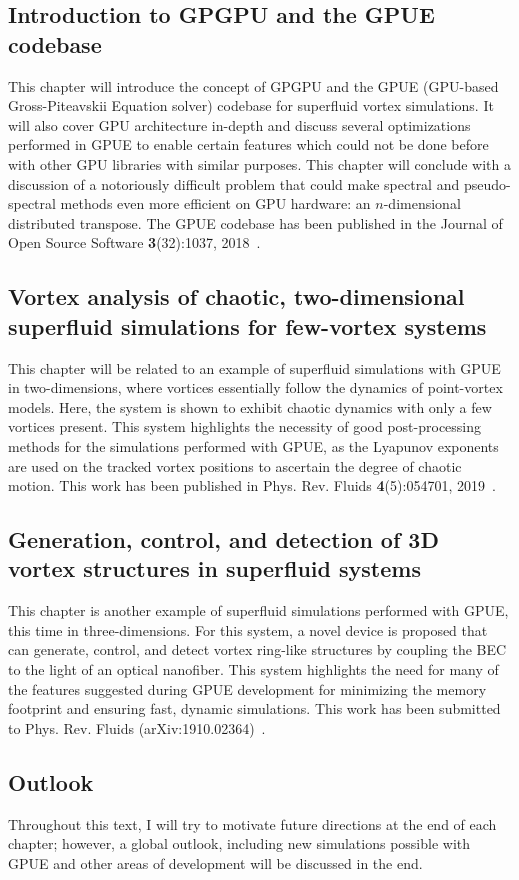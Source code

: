 \subsection*{Introduction to GPGPU and the GPUE codebase}

This chapter will introduce the concept of GPGPU and the GPUE (GPU-based Gross-Piteavskii Equation solver) codebase for superfluid vortex simulations.
It will also cover GPU architecture in-depth and discuss several optimizations performed in GPUE to enable certain features which could not be done before with other GPU libraries with similar purposes.
This chapter will conclude with a discussion of a notoriously difficult problem that could make spectral and pseudo-spectral methods even more efficient on GPU hardware: an $n$-dimensional distributed transpose.
The GPUE codebase has been published in the Journal of Open Source Software \textbf{3}(32):1037, 2018~\cite{schloss2018}.

\subsection*{Vortex analysis of chaotic, two-dimensional superfluid simulations for few-vortex systems}

This chapter will be related to an example of superfluid simulations with GPUE in two-dimensions, where vortices essentially follow the dynamics of point-vortex models.
Here, the system is shown to exhibit chaotic dynamics with only a few vortices present.
This system highlights the necessity of good post-processing methods for the simulations performed with GPUE, as the Lyapunov exponents are used on the tracked vortex positions to ascertain the degree of chaotic motion.
This work has been published in Phys. Rev. Fluids \textbf{4}(5):054701, 2019~\cite{zhang2019}.

\subsection*{Generation, control, and detection of 3D vortex structures in superfluid systems}

This chapter is another example of superfluid simulations performed with GPUE, this time in three-dimensions.
For this system, a novel device is proposed that can generate, control, and detect vortex ring-like structures by coupling the BEC to the light of an optical nanofiber.
This system highlights the need for many of the features suggested during GPUE development for minimizing the memory footprint and ensuring fast, dynamic simulations.
This work has been submitted to Phys. Rev. Fluids (arXiv:1910.02364)~\cite{schloss2019}.

\subsection*{Outlook}
Throughout this text, I will try to motivate future directions at the end of each chapter; however, a global outlook, including new simulations possible with GPUE and other areas of development will be discussed in the end.
